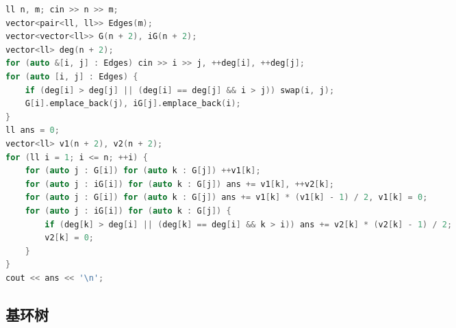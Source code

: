 \documentclass[10pt]{ctexart}
\begin{document}
\begin{multicols}{3}
\begin{lstlisting}[language={C++}]
ll n, m; cin >> n >> m;
vector<pair<ll, ll>> Edges(m);
vector<vector<ll>> G(n + 2), iG(n + 2);
vector<ll> deg(n + 2);
for (auto &[i, j] : Edges) cin >> i >> j, ++deg[i], ++deg[j];
for (auto [i, j] : Edges) {
    if (deg[i] > deg[j] || (deg[i] == deg[j] && i > j)) swap(i, j);
    G[i].emplace_back(j), iG[j].emplace_back(i);
}
ll ans = 0;
vector<ll> v1(n + 2), v2(n + 2);
for (ll i = 1; i <= n; ++i) {
    for (auto j : G[i]) for (auto k : G[j]) ++v1[k];
    for (auto j : iG[i]) for (auto k : G[j]) ans += v1[k], ++v2[k];
    for (auto j : G[i]) for (auto k : G[j]) ans += v1[k] * (v1[k] - 1) / 2, v1[k] = 0;
    for (auto j : iG[i]) for (auto k : G[j]) {
        if (deg[k] > deg[i] || (deg[k] == deg[i] && k > i)) ans += v2[k] * (v2[k] - 1) / 2;
        v2[k] = 0;
    }
}
cout << ans << '\n';
\end{lstlisting}

    \subsection{基环树}\label{ux57faux73afux6811}


\end{multicols}
\end{document}
